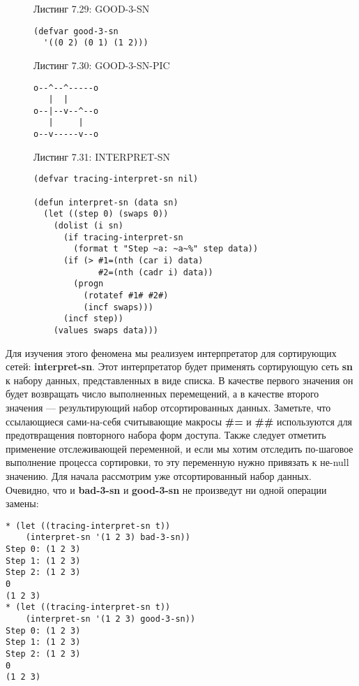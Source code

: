 \begin{figure}Листинг 7.29: GOOD-3-SN\label{listing_7.29}
\listbegin
\begin{verbatim}
(defvar good-3-sn
  '((0 2) (0 1) (1 2))) 
\end{verbatim}
\listend
\end{figure}

\begin{figure}Листинг 7.30: GOOD-3-SN-PIC\label{listing_7.30}
\listbegin
\begin{verbatim}
o--^--^-----o
   |  |
o--|--v--^--o
   |     |
o--v-----v--o
\end{verbatim}
\listend
\end{figure}

\begin{figure}Листинг 7.31: INTERPRET-SN\label{listing_7.31}
\listbegin
\begin{verbatim}
(defvar tracing-interpret-sn nil)

(defun interpret-sn (data sn)
  (let ((step 0) (swaps 0))
    (dolist (i sn)
      (if tracing-interpret-sn
        (format t "Step ~a: ~a~%" step data))
      (if (> #1=(nth (car i) data)
             #2=(nth (cadr i) data))
        (progn
          (rotatef #1# #2#)
          (incf swaps)))
      (incf step))
    (values swaps data)))
\end{verbatim}
\listend
\end{figure}

Для изучения этого феномена мы реализуем интерпретатор для сортирующих сетей: \textbf{interpret-sn}. Этот интерпретатор будет применять сортирующую сеть \textbf{sn} к набору данных, представленных в виде списка. В качестве первого значения он будет возвращать число выполненных перемещений, а в качестве второго значения --- результирующий набор отсортированных данных. Заметьте, что ссылающиеся сами-на-себя считывающие макросы \textbf{\#=} и \textbf{\#\#} используются для предотвращения повторного набора форм доступа. Также следует отметить применение отслеживающей переменной, и если мы хотим отследить по-шаговое выполнение процесса сортировки, то эту переменную нужно привязать к не-null значению. Для начала рассмотрим уже отсортированный набор данных. Очевидно, что и \textbf{bad-3-sn} и \textbf{good-3-sn} не произведут ни одной операции замены:

\begin{verbatim}
* (let ((tracing-interpret-sn t))
    (interpret-sn '(1 2 3) bad-3-sn))
Step 0: (1 2 3)
Step 1: (1 2 3)
Step 2: (1 2 3)
0
(1 2 3)
* (let ((tracing-interpret-sn t))
    (interpret-sn '(1 2 3) good-3-sn))
Step 0: (1 2 3)
Step 1: (1 2 3)
Step 2: (1 2 3)
0
(1 2 3)
\end{verbatim}

